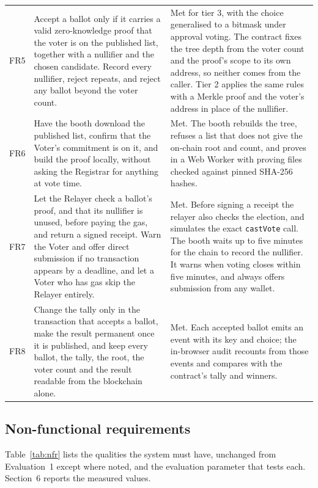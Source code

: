 \begin{longtable}{@{}>{\RaggedRight\arraybackslash\small}p{1.0cm}>{\RaggedRight\arraybackslash\small}p{7.0cm}>{\RaggedRight\arraybackslash\small}p{9.3cm}@{}}
  \addlinespace[2pt]
  FR5 & Accept a ballot only if it carries a valid zero-knowledge proof that the voter is on the published list, together with a nullifier and the chosen candidate. Record every nullifier, reject repeats, and reject any ballot beyond the voter count. & Met for tier 3, with the choice generalised to a bitmask under approval voting. The contract fixes the tree depth from the voter count and the proof's scope to its own address, so neither comes from the caller. Tier 2 applies the same rules with a Merkle proof and the voter's address in place of the nullifier. \\
  \addlinespace[2pt]
  FR6 & Have the booth download the published list, confirm that the Voter's commitment is on it, and build the proof locally, without asking the Registrar for anything at vote time. & Met. The booth rebuilds the tree, refuses a list that does not give the on-chain root and count, and proves in a Web Worker with proving files checked against pinned SHA-256 hashes. \\
  \addlinespace[2pt]
  FR7 & Let the Relayer check a ballot's proof, and that its nullifier is unused, before paying the gas, and return a signed receipt. Warn the Voter and offer direct submission if no transaction appears by a deadline, and let a Voter who has gas skip the Relayer entirely. & Met. Before signing a receipt the relayer also checks the election, and simulates the exact \texttt{castVote} call. The booth waits up to five minutes for the chain to record the nullifier. It warns when voting closes within five minutes, and always offers submission from any wallet. \\
  \addlinespace[2pt]
  FR8 & Change the tally only in the transaction that accepts a ballot, make the result permanent once it is published, and keep every ballot, the tally, the root, the voter count and the result readable from the blockchain alone. & Met. Each accepted ballot emits an event with its key and choice; the in-browser audit recounts from those events and compares with the contract's tally and winners. \\
\end{longtable}

\subsection{Non-functional requirements}

Table~\ref{tab:nfr} lists the qualities the system must have, unchanged from
Evaluation~1 except where noted, and the evaluation parameter that tests each.
Section~6 reports the measured values.

